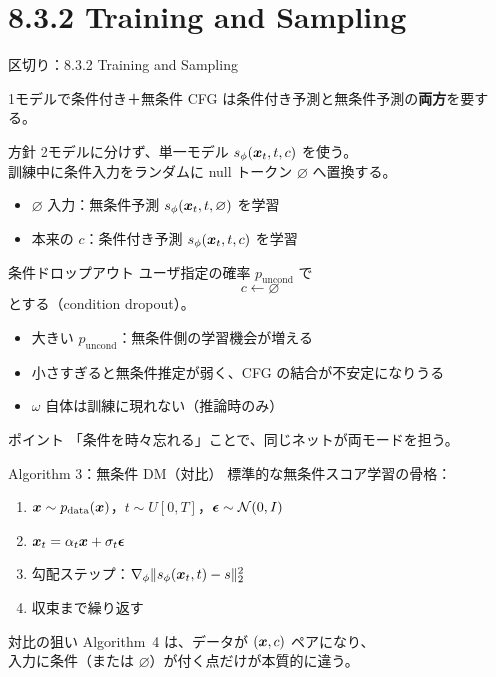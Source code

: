 \section{8.3.2 Training and Sampling}
\asmain
\begin{frame}{区切り：8.3.2 Training and Sampling}
    \tableofcontents[currentsection]
\end{frame}
\asmain
\begin{frame}{1モデルで条件付き＋無条件}
    CFG は条件付き予測と無条件予測の\textbf{両方}を要する。
    \begin{block}{方針}
        2モデルに分けず、単一モデル $s_\phi(\bm{x}_t,t,c)$ を使う。\\
        訓練中に条件入力をランダムに null トークン $\varnothing$ へ置換する。
    \end{block}
    \begin{itemize}
        \item $\varnothing$ 入力：無条件予測 $s_\phi(\bm{x}_t,t,\varnothing)$ を学習
        \item 本来の $c$：条件付き予測 $s_\phi(\bm{x}_t,t,c)$ を学習
    \end{itemize}
\end{frame}
\asmain
\begin{frame}{条件ドロップアウト}
    ユーザ指定の確率 $p_{\mathrm{uncond}}$ で
    \[
        c \leftarrow \varnothing
    \]
    とする（condition dropout）。
    \begin{itemize}
        \item 大きい $p_{\mathrm{uncond}}$：無条件側の学習機会が増える
        \item 小さすぎると無条件推定が弱く、CFG の結合が不安定になりうる
        \item $\omega$ 自体は訓練に現れない（推論時のみ）
    \end{itemize}
    \begin{exampleblock}{ポイント}
        「条件を時々忘れる」ことで、同じネットが両モードを担う。
    \end{exampleblock}
\end{frame}
\asmain
\begin{frame}{Algorithm 3：無条件 DM（対比）}
    標準的な無条件スコア学習の骨格：
    \begin{enumerate}
        \item $\bm{x}\sim p_{\mathrm{data}}(\bm{x})$，$t\sim U[0,T]$，$\bm{\epsilon}\sim\mathcal{N}(0,I)$
        \item $\bm{x}_t=\alpha_t\bm{x}+\sigma_t\bm{\epsilon}$
        \item 勾配ステップ：$\nabla_\phi\|s_\phi(\bm{x}_t,t)-s\|_2^{2}$
        \item 収束まで繰り返す
    \end{enumerate}
    \begin{block}{対比の狙い}
        Algorithm~4 は、データが $(\bm{x},c)$ ペアになり、\\
        入力に条件（または $\varnothing$）が付く点だけが本質的に違う。
    \end{block}
\end{frame}
